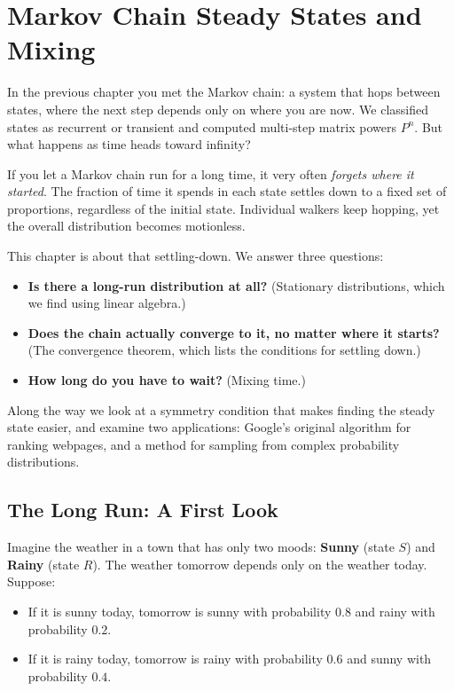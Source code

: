 \chapter{Markov Chain Steady States and Mixing}

In the previous chapter you met the Markov chain: a system that hops between
states, where the next step depends only on where you are now. We classified
states as recurrent or transient and computed multi-step matrix powers $P^n$.
But what happens as time heads toward infinity?

If you let a Markov chain run for a long time, it very often \emph{forgets where
it started}. The fraction of time it spends in each state settles down to a
fixed set of proportions, regardless of the initial state. Individual walkers
keep hopping, yet the overall distribution becomes motionless.

This chapter is about that settling-down. We answer three questions:

\begin{itemize}
  \item \textbf{Is there a long-run distribution at all?} (Stationary distributions, which we find using linear algebra.)
  \item \textbf{Does the chain actually converge to it, no matter where it starts?} (The convergence theorem, which lists the conditions for settling down.)
  \item \textbf{How long do you have to wait?} (Mixing time.)
\end{itemize}

Along the way we look at a symmetry condition that makes finding the steady state easier, and examine two applications: Google's original algorithm for ranking webpages, and a method for sampling from complex probability distributions.

\chapterline

\section{The Long Run: A First Look}
\label{ch24:longrun}

Imagine the weather in a town
that has only two moods: \textbf{Sunny} (state $S$) and \textbf{Rainy} (state
$R$). The weather tomorrow depends only on the weather today. Suppose:

\begin{itemize}
  \item If it is sunny today, tomorrow is sunny with probability $0.8$ and rainy
    with probability $0.2$.
  \item If it is rainy today, tomorrow is rainy with probability $0.6$ and sunny
    with probability $0.4$.
\end{itemize}

